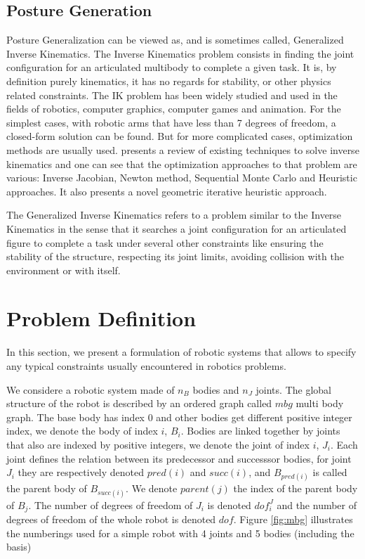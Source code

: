 \subsection{Posture Generation}
\label{sub:posture_generation}

Posture Generalization can be viewed as, and is sometimes called, Generalized Inverse Kinematics.
The Inverse Kinematics problem consists in finding the joint configuration for an articulated multibody to complete a given task.
It is, by definition purely kinematics, it has no regards for stability, or other physics related constraints.
The IK problem has been widely studied and used in the fields of robotics, computer graphics, computer games and animation.
For the simplest cases, with robotic arms that have less than 7 degrees of freedom, a closed-form solution can be found.
But for more complicated cases, optimization methods are usually used.
\cite{aristidou2009} presents a review of existing techniques to solve inverse kinematics and one can see that the optimization approaches to that problem are various: Inverse Jacobian, Newton method, Sequential Monte Carlo and Heuristic approaches. It also presents a novel geometric iterative heuristic approach.

The Generalized Inverse Kinematics refers to a problem similar to the Inverse Kinematics in the sense that it searches a joint configuration for an articulated figure to complete a task under several other constraints like ensuring the stability of the structure, respecting its joint limits, avoiding collision with the environment or with itself.


\section{Problem Definition}
\label{sec:problem_definition}

In this section, we present a formulation of robotic systems that allows to specify any typical constraints usually encountered in robotics problems.

We considere a robotic system made of $n_B$ bodies and $n_J$ joints.
The global structure of the robot is described by an ordered graph called $mbg$ multi body graph.
The base body has index $0$ and other bodies get different positive integer index, we denote the body of index $i$, $B_i$.
Bodies are linked together by joints that also are indexed by positive integers, we denote the joint of index $i$, $J_i$.
Each joint defines the relation between its predecessor and successsor bodies, for joint $J_i$ they are respectively denoted $pred(i)$ and $succ(i)$, and $B_{pred(i)}$ is called the parent body of $B_{succ(i)}$.
We denote $parent(j)$ the index of the parent body of $B_j$.
The number of degrees of freedom of $J_i$ is denoted $dof^J_i$ and the number of degrees of freedom of the whole robot is denoted $dof$.
Figure \ref{fig:mbg} illustrates the numberings used for a simple robot with 4 joints and 5 bodies (including the basis)

